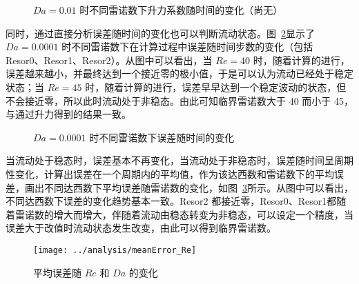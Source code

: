 \begin{figure}
	\setlength{\subfigcapskip}{-1bp}
	\centering
	\begin{minipage}{\textwidth}
		\centering
	\end{minipage}
	\vspace{0.2em}
	\caption{$Da=0.01$ 时不同雷诺数下升力系数随时间的变化（尚无）}
	\label{fig: Cl_t-1e-2}
\end{figure}

同时，通过直接分析误差随时间的变化也可以判断流动状态。图~\ref{fig: resd}显示了 $Da=0.0001$ 时不同雷诺数下在计算过程中误差随时间步数的变化（包括 Resor0、Resor1、Resor2）。从图中可以看出，当 $Re=40$ 时，随着计算的进行，误差越来越小，并最终达到一个接近零的极小值，于是可以认为流动已经处于稳定状态；当 $Re=45$ 时，随着计算的进行，误差早早达到一个稳定波动的状态，但不会接近零，所以此时流动处于非稳态。由此可知临界雷诺数大于 40 而小于 45，与通过升力得到的结果一致。

\begin{figure}
	\centering
	\begin{minipage}{\textwidth}
		\centering
	\end{minipage}
	\centering
	\begin{minipage}{\textwidth}
		\centering
	\end{minipage}
	\caption{$Da=0.0001$ 时不同雷诺数下误差随时间的变化}
	\label{fig: resd}
\end{figure}

当流动处于稳态时，误差基本不再变化，当流动处于非稳态时，误差随时间呈周期性变化，计算出误差在一个周期内的平均值，作为该达西数和雷诺数下的平均误差，画出不同达西数下平均误差随雷诺数的变化，如图~\ref{fig: error}所示。从图中可以看出，不同达西数下误差的变化趋势基本一致。Resor2 都接近零，Resor0、Resor1都随着雷诺数的增大而增大，伴随着流动由稳态转变为非稳态，可以设定一个精度，当误差大于改值时流动状态发生改变，由此可以得到临界雷诺数。

\begin{figure}
	\centering
	\texttt{[image: ../analysis/meanError\_Re]}
	\caption{平均误差随 $Re$ 和 $Da$ 的变化}
	\label{fig: error}
\end{figure}

